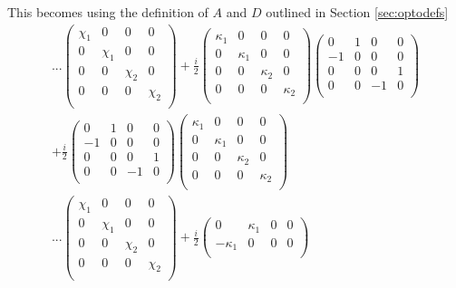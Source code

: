 \documentclass[11pt,a4paper]{article}
\numberwithin{equation}{section}
\begin{document}
	
	This becomes using the definition of $A$ and $D$ outlined in Section \ref{sec:optodefs}
	\begin{align*}
	&...\begin{pmatrix}
	\chi_1 & 0 & 0 & 0\\
	0 & \chi_1 & 0 & 0\\
	0 & 0 & \chi_2 & 0 \\
	0 & 0 & 0 & \chi_2\\
	\end{pmatrix} + \frac{i}{2}\begin{pmatrix}
	\kappa_1 & 0 & 0 & 0\\
	0 & \kappa_1 & 0 & 0\\
	0 & 0 & \kappa_2 & 0 \\
	0 & 0 & 0 & \kappa_2\\
	\end{pmatrix}\begin{pmatrix}
	0 & 1 & 0 & 0 \\
	-1 & 0 & 0 & 0\\
	0 & 0 & 0 & 1\\
	0 & 0 & -1 & 0\\
	\end{pmatrix}&\\
	&+ \frac{i}{2}\begin{pmatrix}
	0 & 1 & 0 & 0 \\
	-1 & 0 & 0 & 0\\
	0 & 0 & 0 & 1\\
	0 & 0 & -1 & 0\\
	\end{pmatrix}\begin{pmatrix}
	\kappa_1 & 0 & 0 & 0\\
	0 & \kappa_1 & 0 & 0\\
	0 & 0 & \kappa_2 & 0 \\
	0 & 0 & 0 & \kappa_2\\
	\end{pmatrix}&\\
	&...\begin{pmatrix}
	\chi_1 & 0 & 0 & 0\\
	0 & \chi_1 & 0 & 0\\
	0 & 0 & \chi_2 & 0 \\
	0 & 0 & 0 & \chi_2\\
	\end{pmatrix} + \frac{i}{2}\begin{pmatrix}
	0 & \kappa_1 & 0 & 0 \\
	-\kappa_1 & 0 & 0 & 0\\

\end{pmatrix}
\end{align*}
\end{document}
